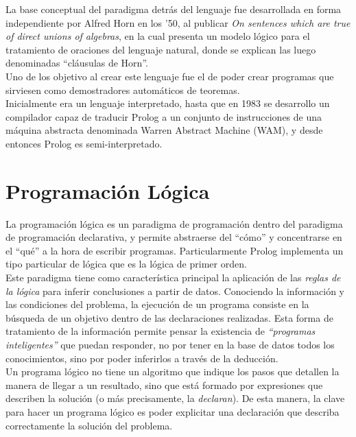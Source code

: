 \documentclass[12pt,titlepage]{article}
\begin{document}
La base conceptual del paradigma detrás del lenguaje fue desarrollada en forma independiente por Alfred Horn en los '50, al publicar \textit{On sentences which are true of direct unions of algebras}, en la cual presenta un modelo lógico para el tratamiento de oraciones del lenguaje natural, donde se explican las luego denominadas ``cláusulas de Horn''. \\

Uno de los objetivo al crear este lenguaje fue el de poder crear programas que sirviesen como demostradores automáticos de teoremas. \\

Inicialmente era un lenguaje interpretado, hasta que en 1983 se desarrollo un compilador capaz de traducir Prolog a un conjunto de instrucciones de una máquina abstracta denominada Warren Abstract Machine (WAM), y desde entonces Prolog es semi-interpretado. \\

\section{Programación Lógica}
La programación lógica es un paradigma de programación dentro del paradigma de programación declarativa, y permite abstraerse del ``cómo'' y concentrarse en el ``qué'' a la hora de escribir programas. Particularmente Prolog implementa un tipo particular de lógica que es la lógica de primer orden. \\

Este paradigma tiene como característica principal la aplicación de las \emph{reglas de la lógica} para inferir conclusiones a partir de datos. Conociendo la información y las condiciones del problema, la ejecución de un programa consiste en la búsqueda de un objetivo dentro de las declaraciones realizadas. Esta forma de tratamiento de la información permite pensar la existencia de \emph{``programas inteligentes''} que puedan responder, no por tener en la base de datos todos los conocimientos, sino por poder inferirlos a través de la deducción.  \\

Un programa lógico no tiene un algoritmo que indique los pasos que detallen la manera de llegar a un resultado, sino que está formado por expresiones que describen la solución (o más precisamente, la \emph{declaran}). De esta manera, la clave para hacer un programa lógico es poder explicitar una declaración que describa correctamente la solución del problema. \\
\end{document}
